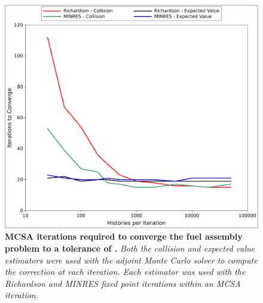 \begin{figure}[t!]
  \begin{center}
    \includegraphics[width=6in]{chapters/spn_equations/estimator_iters.pdf}
  \end{center}
  \caption{\textbf{MCSA iterations required to converge the fuel
      assembly problem to a tolerance of .} \textit{Both the
      collision and expected value estimators were used with the
      adjoint Monte Carlo solver to compute the correction at each
      iteration. Each estimator was used with the Richardson and
      MINRES fixed point iterations within an MCSA iteration.}}
  \label{fig:spn_estimator_iters}
\end{figure}

